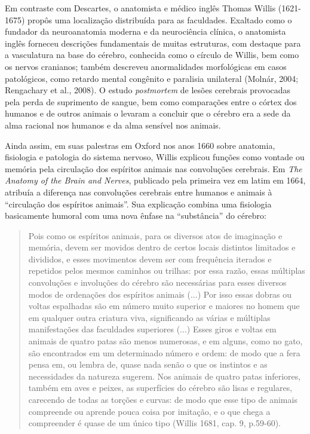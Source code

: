 Em contraste com Descartes, o anatomista e médico inglês Thomas Willis
(1621-1675) propôs uma localização distribuída para as faculdades.
Exaltado como o fundador da neuroanatomia moderna e da neurociência
clínica, o anatomista inglês forneceu descrições fundamentais de muitas
estruturas, com destaque para a vasculatura na base do cérebro,
conhecida como o círculo de Willis, bem como os nervos cranianos; também
descreveu anormalidades morfológicas em casos patológicos, como retardo
mental congênito e paralisia unilateral (Molnár, 2004; Rengachary et
al., 2008). O estudo \emph{postmortem} de lesões cerebrais provocadas
pela perda de suprimento de sangue, bem como comparações entre o córtex
dos humanos e de outros animais o levaram a concluir que o cérebro era a
sede da alma racional nos humanos e da alma sensível nos animais.

Ainda assim, em suas palestras em Oxford nos anos 1660 sobre anatomia,
fisiologia e patologia do sistema nervoso, Willis explicou funções como
vontade ou memória pela circulação dos espíritos animais nas convoluções
cerebrais. Em \emph{The Anatomy of the Brain and Nerves}, publicado pela
primeira vez em latim em 1664, atribuía a diferença nas convoluções
cerebrais entre humanos e animais à ``circulação dos espíritos
animais''. Sua explicação combina uma fisiologia basicamente humoral com
uma nova ênfase na ``substância'' do cérebro:

\begin{quote}
Pois como os espíritos animais, para os diversos atos de imaginação e
memória, devem ser movidos dentro de certos locais distintos limitados e
divididos, e esses movimentos devem ser com frequência iterados e
repetidos pelos mesmos caminhos ou trilhas: por essa razão, essas
múltiplas convoluções e involuções do cérebro são necessárias para esses
diversos modos de ordenações dos espíritos animais (...) Por isso essas
dobras ou voltas espalhadas são em número muito superior e maiores no
homem que em qualquer outra criatura viva, significando as várias e
múltiplas manifestações das faculdades superiores (...) Esses giros e
voltas em animais de quatro patas são menos numerosas, e em alguns, como
no gato, são encontrados em um determinado número e ordem: de modo que a
fera pensa em, ou lembra de, quase nada senão o que os instintos e as
necessidades da natureza sugerem. Nos animais de quatro patas
inferiores, também em aves e peixes, as superfícies do cérebro são lisas
e regulares, carecendo de todas as torções e curvas: de modo que esse
tipo de animais compreende ou aprende pouca coisa por imitação, e o que
chega a compreender é quase de um único tipo (Willis 1681, cap. 9,
p.59-60).
\end{quote}


